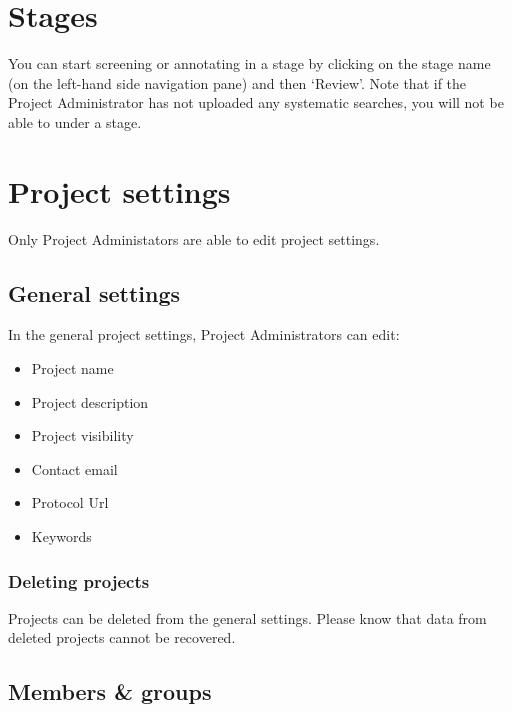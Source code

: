 \documentclass[
]{book}
\providecommand{\tightlist}{%
  \setlength{\itemsep}{0pt}\setlength{\parskip}{0pt}}
\begin{document}
\hypertarget{stages}{%
\section{Stages}\label{stages}}

You can start screening or annotating in a stage by clicking on the stage name (on the left-hand side navigation pane) and then `Review'. Note that if the Project Administrator has not uploaded any systematic searches, you will not be able to under a stage.

\hypertarget{project-settings}{%
\section{Project settings}\label{project-settings}}

Only Project Administators are able to edit project settings.

\hypertarget{general-settings}{%
\subsection{General settings}\label{general-settings}}

In the general project settings, Project Administrators can edit:

\begin{itemize}
\tightlist
\item
  Project name
\item
  Project description
\item
  Project visibility
\item
  Contact email
\item
  Protocol Url
\item
  Keywords
\end{itemize}

\hypertarget{deleting-projects}{%
\subsubsection{Deleting projects}\label{deleting-projects}}

Projects can be deleted from the general settings. Please know that data from deleted projects cannot be recovered.

\hypertarget{members-groups}{%
\subsection{Members \& groups}\label{members-groups}}
\end{document}
